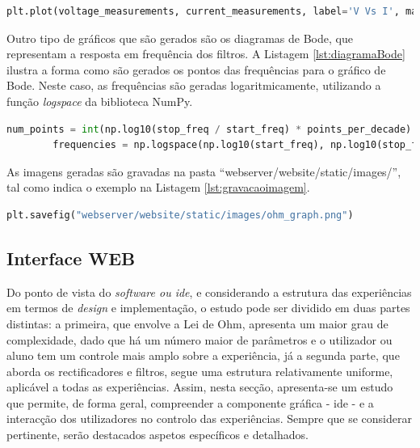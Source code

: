 \begin{minipage}{0.9\linewidth}
	\begin{lstlisting}[language=Python,escapechar=|, caption=Gráfico Corrente \textit{vs} Tensão, label=lst:graficoUvsI]
		plt.plot(voltage_measurements, current_measurements, label='V Vs I', marker = 'o')
	\end{lstlisting}
\end{minipage}

Outro tipo de gráficos que são gerados são os diagramas de Bode, que representam a resposta em frequência dos filtros. A Listagem \ref{lst:diagramaBode} ilustra a forma como são gerados os pontos das frequências para o gráfico de Bode. Neste caso, as frequências são geradas logaritmicamente, utilizando a função \textit{logspace} da biblioteca NumPy.

\begin{minipage}{0.9\linewidth}
	\begin{lstlisting}[language=Python,escapechar=|, caption=Filtros - Diagrama de \textit{Bode}, label=lst:diagramaBode]
		num_points = int(np.log10(stop_freq / start_freq) * points_per_decade)
		frequencies = np.logspace(np.log10(start_freq), np.log10(stop_freq), num=num_points)	
	\end{lstlisting}
\end{minipage}

As imagens geradas são gravadas na pasta ``webserver/website/static/images/'', tal como indica o exemplo na Listagem \ref{lst:gravacaoimagem}. 

\begin{minipage}{0.9\linewidth}
	\begin{lstlisting}[language=Python,escapechar=|, caption=Gravação do gráfico, label=lst:gravacaoimagem]
	    plt.savefig("webserver/website/static/images/ohm_graph.png")	
	\end{lstlisting}
\end{minipage}

\subsection{Interface WEB}
\label{sec:interfaceweb}
Do ponto de vista do \textit{software ou \acrshort{ide}}, e considerando a estrutura das experiências em termos de \textit{design} e implementação, o estudo pode ser dividido em duas partes distintas: a primeira, que envolve a Lei de Ohm, apresenta um maior grau de complexidade, dado que há um número maior de parâmetros e o utilizador ou aluno tem um controle mais amplo sobre a experiência, já a segunda parte, que aborda os rectificadores e filtros, segue uma estrutura relativamente uniforme, aplicável a todas as experiências. Assim, nesta secção, apresenta-se um estudo que permite, de forma geral, compreender a componente gráfica - \acrshort{ide} - e a interacção dos utilizadores no controlo das experiências. Sempre que se considerar pertinente, serão destacados aspetos específicos e detalhados.

